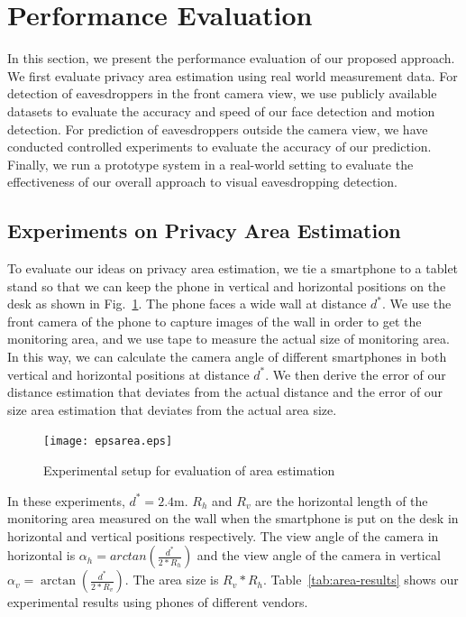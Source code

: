 \section{Performance Evaluation}


In this section, we present the performance evaluation of our proposed approach.
We first evaluate privacy area estimation  using real world measurement data.
For detection of eavesdroppers in the front camera view, we use publicly available datasets to evaluate the accuracy and speed of our face detection and motion detection.
For prediction of eavesdroppers outside the camera view, we have conducted controlled experiments to evaluate the accuracy of our prediction.
Finally, we run a prototype system in a real-world setting to evaluate the effectiveness of our overall approach to visual eavesdropping detection.

\subsection{Experiments on Privacy Area Estimation}
To evaluate our ideas on privacy area estimation, we tie a smartphone to a tablet stand so that we can keep the phone in vertical and horizontal positions on the desk as shown in Fig.~\ref{fig:area-exp}.  The phone faces a wide wall at distance $d^*$.  We use the front camera of the phone to capture images of the wall in order to get the monitoring area, and we use tape to measure the actual size of monitoring area. In this way, we can calculate the camera angle of  different smartphones in both vertical and horizontal positions at distance $d^*$.  We  then derive  the error of our distance estimation that deviates from the actual distance and the error of our size area estimation that deviates from the actual area size.
\begin{figure}[!htb]
\centering
\texttt{[image: epsarea.eps]}
\caption{Experimental setup for evaluation of area estimation}
\label{fig:area-exp}
\end{figure}

In these experiments,  $d^*= 2.4$m.  $R_h$ and $R_v$  are the horizontal length  of the monitoring area  measured on the wall when the smartphone is put on the desk in horizontal and vertical positions respectively.
The view angle of the camera in horizontal is $\alpha_h = arctan(\frac{d^*}{2*R_h})$ and the view angle of the camera in vertical $\alpha_v = \arctan(\frac{d^*}{2*R_v})$. The area size is $R_v*R_h$.  Table~\ref{tab:area-results} shows our experimental results using phones of different vendors.


